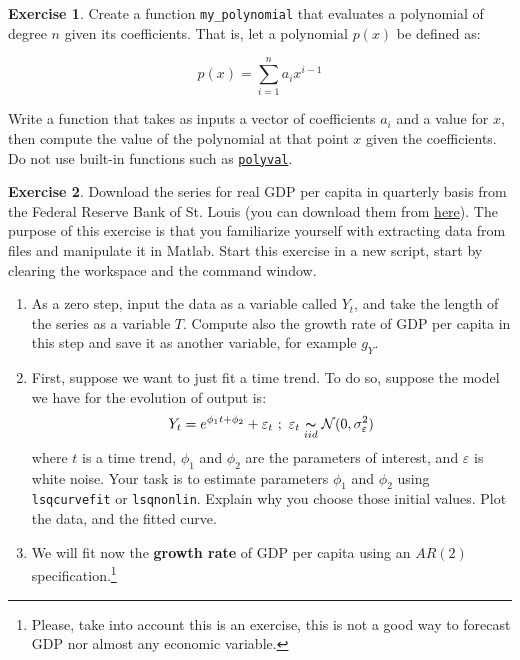 \documentclass[a4paper,11pt]{article}
\theoremstyle{definition}
\newtheorem{exercise}{Exercise}
\begin{document}
\begin{exercise}
Create a function \verb;my_polynomial; that evaluates a polynomial of degree $n$ given its coefficients. That is, let a polynomial $p(x)$ be defined as:

\[
p(x) = \sum^n_{i=1}a_i x^{i-1}
\]	
	
Write a function that takes as inputs a vector of coefficients $a_i$ and a value for $x$, then compute the value of the polynomial at that point $x$ given the coefficients. Do not use built-in functions such as \href{https://www.mathworks.com/help/matlab/ref/polyval.html}{\texttt{polyval}}.
\end{exercise}

\begin{exercise}
Download the series for real GDP per capita in quarterly basis from the Federal Reserve Bank of St. Louis (you can download them from \href{https://fred.stlouisfed.org/series/A939RX0Q048SBEA}{here}). The purpose of this exercise is that you familiarize yourself with extracting data from files and manipulate it in Matlab. Start this exercise in a new script, start by clearing the workspace and the command window.

\begin{enumerate}
	\item As a zero step, input the data as a variable called $Y_t$, and take the length of the series as a variable $T$. Compute also the growth rate of GDP per capita in this step and save it as another variable, for example $g_Y$.
	\item First, suppose we want to just fit a time trend. To do so, suppose the model we have for the evolution of output is:
	\begin{equation}
	Y_t = e^{\phi_1 t + \phi_2} + \varepsilon_t \ ; \ \varepsilon_t \underset{iid}{\thicksim} \mathcal{N}(0,\sigma^2_{\varepsilon})
	\label{model_1}
	\end{equation}
	where $t$ is a time trend, $\phi_1$ and $\phi_2$ are the parameters of interest, and $\varepsilon$ is white noise. Your task is to estimate parameters $\phi_1$ and $\phi_2$ using \verb;lsqcurvefit; or \verb;lsqnonlin;. Explain why you choose those initial values. Plot the data, and the fitted curve.

	\item We will fit now the \textbf{growth rate} of GDP per capita using an $AR(2)$ specification.\footnote{Please, take into account this is an exercise, this is not a good way to forecast GDP nor almost any economic variable.}
	

\end{enumerate}
\end{exercise}
\end{document}
